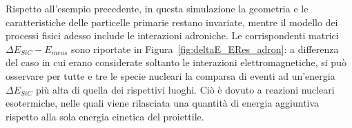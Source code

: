 Rispetto all'esempio precedente, in questa simulazione la geometria e le caratteristiche delle particelle primarie restano invariate, mentre il modello dei processi fisici adesso include le interazioni adroniche. 
Le corrispondenti matrici $\Delta E_{SiC} - E_{meas}$ sono riportate in Figura~\ref{fig:deltaE_ERes_adron}: a differenza del caso in cui erano considerate soltanto le interazioni elettromagnetiche, si può osservare per tutte e tre le specie nucleari la comparsa di eventi ad un'energia $\Delta E_{SiC}$ più alta di quella dei rispettivi luoghi.
Ciò è dovuto a reazioni nucleari esotermiche, nelle quali viene rilasciata una quantità di energia aggiuntiva rispetto alla sola energia cinetica del proiettile.









\subsection{} \label{sez:studio_PID}


